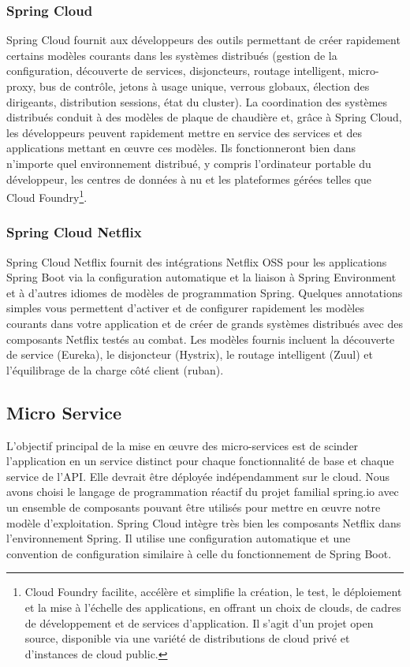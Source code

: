  \subsubsection{Spring Cloud}
 Spring Cloud fournit aux développeurs des outils permettant de créer rapidement certains modèles courants dans les systèmes distribués (gestion de la configuration, découverte de services, disjoncteurs, routage intelligent, micro-proxy, bus de contrôle, jetons à usage unique, verrous globaux, élection des dirigeants, distribution sessions, état du cluster). La coordination des systèmes distribués conduit à des modèles de plaque de chaudière et, grâce à Spring Cloud, les développeurs peuvent rapidement mettre en service des services et des applications mettant en œuvre ces modèles. Ils fonctionneront bien dans n’importe quel environnement distribué, y compris l’ordinateur portable du développeur, les centres de données à nu et les plateformes gérées telles que Cloud Foundry\footnote[1]{\samepage Cloud Foundry facilite, accélère et simplifie la création, le test, le déploiement et la mise à l'échelle des applications, en offrant un choix de clouds, de cadres de développement et de services d'application. Il s'agit d'un projet open source, disponible via une variété de distributions de cloud privé et d'instances de cloud public.}.
 
 
  \subsubsection{Spring Cloud Netflix}
 Spring Cloud Netflix fournit des intégrations Netflix OSS pour les applications Spring Boot via la configuration automatique et la liaison à Spring Environment et à d'autres idiomes de modèles de programmation Spring. Quelques annotations simples vous permettent d'activer et de configurer rapidement les modèles courants dans votre application et de créer de grands systèmes distribués avec des composants Netflix testés au combat. Les modèles fournis incluent la découverte de service (Eureka), le disjoncteur (Hystrix), le routage intelligent (Zuul) et l’équilibrage de la charge côté client (ruban).
 
 \subsection{   Micro Service }

 L'objectif principal de la mise en œuvre des micro-services est de scinder l'application en un service distinct pour chaque fonctionnalité de base et chaque service de l'API. Elle devrait être déployée indépendamment sur le cloud. Nous avons choisi le langage de programmation réactif du projet familial spring.io avec un ensemble de composants pouvant être utilisés pour mettre en œuvre notre modèle d'exploitation. Spring Cloud intègre très bien les composants Netflix dans l’environnement Spring. Il utilise une configuration automatique et une convention de configuration similaire à celle du fonctionnement de Spring Boot.


